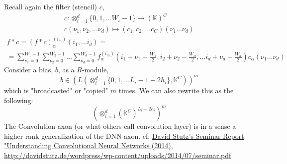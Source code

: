 \documentclass[10pt]{amsart}
\begin{document}
\begin{multicols*}{2}
Recall again the filter (stencil) $c$, 
\begin{equation}
\begin{gathered}
c: \otimes_{i=1}^d \lbrace 0 ,1,\dots W_i -1\rbrace \to (\mathbb{K})^C  \\
c(\nu_1, \nu_2 ,\dots \nu_d) \mapsto (c_1,c_2, \dots c_C)(\nu_1\dots \nu_d) 
\end{gathered}
\end{equation}
\begin{equation}
\begin{gathered}
f*c = (f*c)_{\alpha}^{(i_m)}(i_1,\dots i_d) = \\
= \sum_{\nu_1=0}^{W_1-1} \sum_{\nu_2=0}^{W_2-1} \dots \sum_{\nu_d=0}^{W_d-1} f_{\alpha}^{(i_m)}(i_1 + \nu_1 - \frac{W_1}{2}, i_2 + \nu_2 - \frac{W_{\alpha}}{2}, \dots i_d + \nu_d - \frac{W_d}{2}) c_{\alpha}(\nu_1 \dots \nu_d)
\end{gathered}
\end{equation}
Consider a bias, $b$, as a $R$-module, 
\[
b \in \left( L (\otimes_{i=1}^d \lbrace 0 ,1, \dots L_i - 1 - 2h_i \rbrace , \mathbb{K}^C) \right)^m
\]
which is "broadcasted" or "copied" $m$ times.  
We can also rewrite this as the following:
\[
\left( \otimes_{i=1}^d ( \mathbb{K}^C)^{L_i - 2h_i} \right)^m  
\]
The Convolution axon (or what others call convolution layer) is in a sense a higher-rank generalization of the DNN axon.  
cf. \href{http://davidstutz.de/wordpress/wp-content/uploads/2014/07/seminar.pdf}{David Stutz's Seminar Report "Understanding Convolutional Neural Networks (2014)}, \url{http://davidstutz.de/wordpress/wp-content/uploads/2014/07/seminar.pdf}






\end{multicols*}
\end{document}
